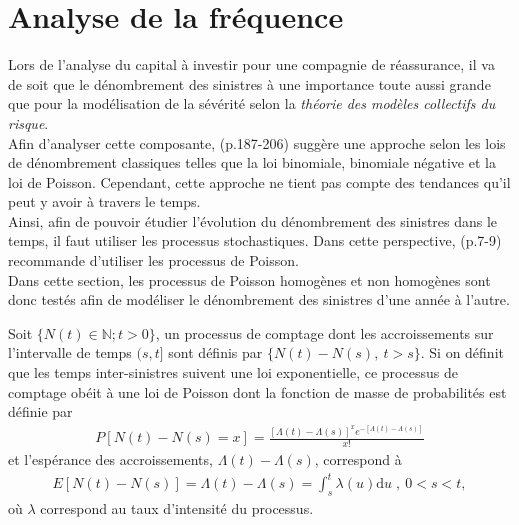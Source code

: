 \section{Analyse de la fréquence}\label{Section_Frequence}
	Lors de l'analyse du capital à investir pour une compagnie de réassurance, il va de soit que le dénombrement des sinistres à une importance toute aussi grande que pour la modélisation de la sévérité selon la \textit{théorie des modèles collectifs du risque}. \\
	
	Afin d'analyser cette composante, \cite{Parodi2015_Pricing_in_GenIns}(p.187-206) suggère une approche selon les lois de dénombrement classiques telles que la loi binomiale, binomiale négative et la loi de Poisson. Cependant, cette approche ne tient pas compte des tendances qu'il peut y avoir à travers le temps.\\
	
	Ainsi, afin de pouvoir étudier l'évolution du dénombrement des sinistres dans le temps, il faut utiliser les processus stochastiques. Dans cette perspective, \cite{Mikosch_PoissProcess2009}(p.7-9) recommande d'utiliser les processus de Poisson.\\
	
	Dans cette section, les processus de Poisson homogènes et non homogènes sont donc testés afin de modéliser le dénombrement des sinistres d'une année à l'autre.
	
	\begin{Definition}
		Soit $\{ N(t)\in \mathbb{N};t>0 \} $, un processus de comptage dont les accroissements sur l'intervalle de temps $(s,t]$ sont définis par $\{ N(t)-N(s),\:t>s\}$. Si on définit que les temps inter-sinistres suivent une loi exponentielle, ce processus de comptage obéit à une loi de Poisson dont la fonction de masse de probabilités est définie par
		\begin{align}
		P\left[N\left(t\right)-N\left(s \right) = x \right] = \frac{\left[\Lambda(t) - \Lambda(s)\right]^x e^{-\left[\Lambda(t) - \Lambda(s)\right]}}{x!}  \label{ProcessusPoisson}
		\end{align}
		et l'espérance des accroissements, $\Lambda \left( t\right) -\Lambda \left( s\right) $, correspond à 
		\begin{align}
		E[N(t)-N(s)] = \Lambda(t) - \Lambda(s) = \int_{s}^{t} \lambda(u)\textrm{d}u \;  ,\ 0<s<t, \label{Esp_Accroissements}
		\end{align}
		où $\lambda$ correspond au taux d'intensité du processus. 
	\end{Definition}

